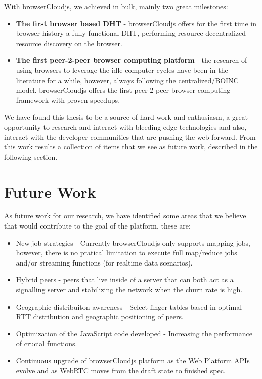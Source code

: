 With browserCloudjs, we achieved in bulk, mainly two great milestones:

\begin{itemize}
    \item \textbf{The first browser based DHT} - browserCloudjs offers for the first time in browser history a fully functional DHT, performing resource decentralized resource discovery on the browser. 
    \item \textbf{The first peer-2-peer browser computing platform} - the research of using browsers to leverage the idle computer cycles have been in the literature for a while, however, always following the centralized/BOINC model. browserCloudjs offers the first peer-2-peer browser computing framework with proven speedups.
\end{itemize}

We have found this thesis to be a source of hard work and enthusiasm, a great opportunity to research and interact with bleeding edge technologies and also, interact with the developer communities that are pushing the web forward. From this work results a collection of items that we see as future work, described in the following section.

\section{Future Work}

As future work for our research, we have identified some areas that we believe that would contribute to the goal of the platform, these are:

\begin{itemize}
    \item New job strategies - Currently browserCloudjs only supports mapping jobs, however, there is no pratical limitation to execute full map/reduce jobs and/or streaming functions (for realtime data scenarios).
    \item Hybrid peers - peers that live inside of a server that can both act as a signalling server and stabilizing the network when the churn rate is high.
    \item Geographic distribuiton awareness - Select finger tables based in optimal RTT distribution and geographic positioning of peers.
    \item Optimization of the JavaScript code developed - Increasing the performance of crucial functions.
    \item Continuous upgrade of browserCloudjs platform as the Web Platform APIs evolve and as WebRTC moves from the draft state to finished spec.
\end{itemize}
